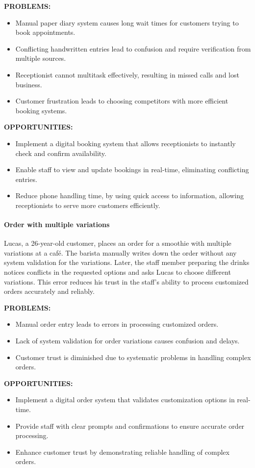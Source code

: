 \documentclass[]{VUMIFTemplateClass}
\newcommand{\subsubsubsection}[1]{\paragraph{#1}}
\begin{document}
\textbf{PROBLEMS:}
\begin{itemize}
    \item Manual paper diary system causes long wait times for customers trying to book appointments.
    \item Conflicting handwritten entries lead to confusion and require verification from multiple sources.
    \item Receptionist cannot multitask effectively, resulting in missed calls and lost business.
    \item Customer frustration leads to choosing competitors with more efficient booking systems.
\end{itemize}
\textbf{OPPORTUNITIES:}
\begin{itemize}
    \item Implement a digital booking system that allows receptionists to instantly check and confirm availability.
    \item Enable staff to view and update bookings in real-time, eliminating conflicting entries.
    \item Reduce phone handling time, by using quick access to information, allowing receptionists to serve more customers efficiently.
\end{itemize}

\subsubsubsection{Order with multiple variations}

Lucas, a 26-year-old customer, places an order for a smoothie with multiple
variations at a café. The barista manually writes down the order without any
system validation for the variations. Later, the staff member preparing the
drinks notices conflicts in the requested options and asks Lucas to choose
different variations. This error reduces his trust in the staff’s ability to
process customized orders accurately and reliably.

\textbf{PROBLEMS:}
\begin{itemize}
    \item Manual order entry leads to errors in processing customized orders.
    \item Lack of system validation for order variations causes confusion and delays.
    \item Customer trust is diminished due to systematic problems in handling complex orders.
\end{itemize}
\textbf{OPPORTUNITIES:}
\begin{itemize}
    \item Implement a digital order system that validates customization options in real-time.
    \item Provide staff with clear prompts and confirmations to ensure accurate order processing.
    \item Enhance customer trust by demonstrating reliable handling of complex orders.
\end{itemize}
\end{document}
